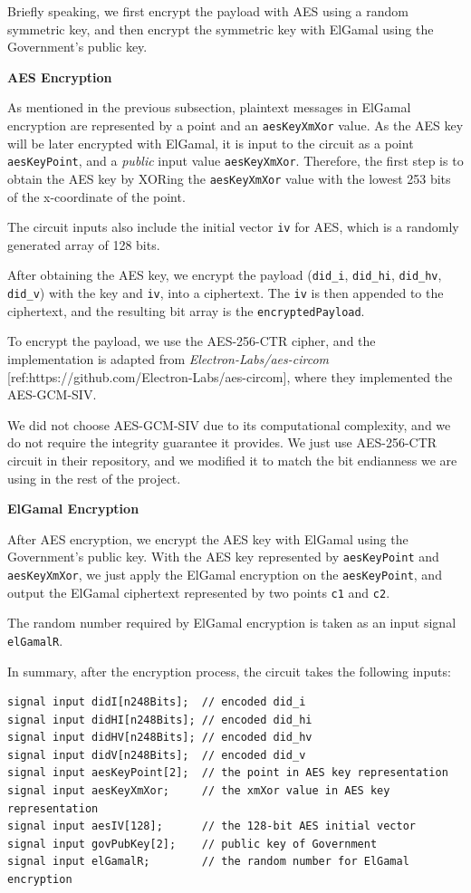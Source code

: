 \documentclass[
]{report}
\begin{document}
Briefly speaking, we first encrypt the payload with AES using a random
symmetric key, and then encrypt the symmetric key with ElGamal using the
Government's public key.

\textbf{AES Encryption}

As mentioned in the previous subsection, plaintext messages in ElGamal
encryption are represented by a point and an \texttt{aesKeyXmXor} value.
As the AES key will be later encrypted with ElGamal, it is input to the
circuit as a point \texttt{aesKeyPoint}, and a \emph{public} input value
\texttt{aesKeyXmXor}. Therefore, the first step is to obtain the AES key
by XORing the \texttt{aesKeyXmXor} value with the lowest 253 bits of the
x-coordinate of the point.

The circuit inputs also include the initial vector \texttt{iv} for AES,
which is a randomly generated array of 128 bits.

After obtaining the AES key, we encrypt the payload (\texttt{did\_i},
\texttt{did\_hi}, \texttt{did\_hv}, \texttt{did\_v}) with the key and
\texttt{iv}, into a ciphertext. The \texttt{iv} is then appended to the
ciphertext, and the resulting bit array is the
\texttt{encryptedPayload}.

To encrypt the payload, we use the AES-256-CTR cipher, and the
implementation is adapted from \emph{Electron-Labs/aes-circom}
{[}ref:https://github.com/Electron-Labs/aes-circom{]},
where they implemented the AES-GCM-SIV.

We did not choose AES-GCM-SIV due to its computational complexity, and
we do not require the integrity guarantee it provides. We just use
AES-256-CTR circuit in their repository, and we modified it to match the
bit endianness we are using in the rest of the project.

\textbf{ElGamal Encryption}

After AES encryption, we encrypt the AES key with ElGamal using the
Government's public key. With the AES key represented by
\texttt{aesKeyPoint} and \texttt{aesKeyXmXor}, we just apply the ElGamal
encryption on the \texttt{aesKeyPoint}, and output the ElGamal
ciphertext represented by two points \texttt{c1} and \texttt{c2}.

The random number required by ElGamal encryption is taken as an input
signal \texttt{elGamalR}.

In summary, after the encryption process, the circuit takes the
following inputs:

\begin{verbatim}
signal input didI[n248Bits];  // encoded did_i
signal input didHI[n248Bits]; // encoded did_hi
signal input didHV[n248Bits]; // encoded did_hv
signal input didV[n248Bits];  // encoded did_v
signal input aesKeyPoint[2];  // the point in AES key representation
signal input aesKeyXmXor;     // the xmXor value in AES key representation
signal input aesIV[128];      // the 128-bit AES initial vector
signal input govPubKey[2];    // public key of Government
signal input elGamalR;        // the random number for ElGamal encryption
\end{verbatim}
\end{document}
